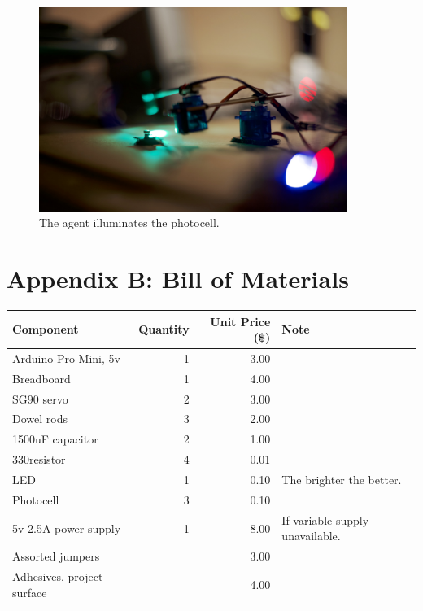 \documentclass{article}
\begin{document}
		\begin{figure}[!htb]
			\centering
			\includegraphics[width=10cm]{../photos/action_detail_small.jpg}
			\caption{The agent illuminates the photocell.}
			\label{fig:breadboard}
		\end{figure}

	
	\section{Appendix B: Bill of Materials}
	

	\begin{center}
		\begin{tabular}{ l r r  p{5cm} }
			\hline
			Component & Quantity & Unit Price (\$) & Note \\ \hline
			Arduino Pro Mini, 5v & 1 & 3.00 &  \\ 
			Breadboard & 1 & 4.00 & \\
			SG90 servo & 2 & 3.00 & \\ 
			Dowel rods & 3 & 2.00 & \\
			1500uF capacitor & 2 & 1.00 & \\ 
			330\ohm\space resistor & 4 & 0.01 \\
			LED & 1 & 0.10 & The brighter the better.\\ 
			Photocell & 3 & 0.10 & \\ 
			5v 2.5A power supply & 1 & 8.00 & If variable supply unavailable. \\ 
			Assorted jumpers & & 3.00 & \\
			Adhesives, project surface & & 4.00 & \\
			\hline
			
		\end{tabular}
	\end{center}
	
	
\end{document}
